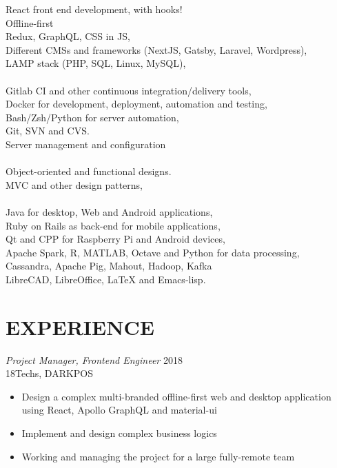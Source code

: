 \documentclass[margin, 10pt]{res} %
\begin{document}
\begin{resume}
React front end development, with hooks! \\
Offline-first \\
Redux, GraphQL, CSS in JS, \\
Different CMSs and frameworks (NextJS, Gatsby, Laravel, Wordpress), \\
LAMP stack (PHP, SQL, Linux, MySQL), \\
\\
Gitlab CI and other continuous integration/delivery tools, \\
Docker for development, deployment, automation and testing, \\
Bash/Zsh/Python for server automation, \\
Git, SVN and CVS. \\
Server management and configuration \\
\\
Object-oriented and functional designs. \\
MVC and other design patterns, \\
\\
Java for desktop, Web and Android applications, \\
Ruby on Rails as back-end for mobile applications, \\
Qt and CPP for Raspberry Pi and Android devices, \\
Apache Spark, R, MATLAB, Octave and Python for data processing, \\
Cassandra, Apache Pig, Mahout, Hadoop, Kafka \\
LibreCAD, LibreOffice, LaTeX and Emacs-lisp. \\
 
 
\section{EXPERIENCE}

{\sl Project Manager, Frontend Engineer} \hfill 2018 \\
18Techs, DARKPOS  \\

\begin{itemize} \itemsep -2pt %
\item Design a complex multi-branded offline-first web and desktop application using
  React, Apollo GraphQL and material-ui
\item Implement and design complex business logics
\item Working and managing the project for a large fully-remote team
\end{itemize}


\end{resume}
\end{document}
